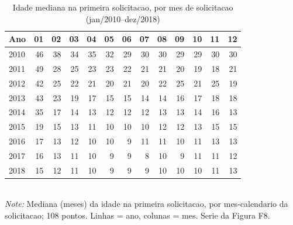 \begin{table}[htbp]\centering
\caption{Idade mediana na primeira solicitacao, por mes de solicitacao (jan/2010--dez/2018)}
\label{tab:S7c}
\small
\begin{tabular}{lrrrrrrrrrrrr}
\toprule
Ano & 01 & 02 & 03 & 04 & 05 & 06 & 07 & 08 & 09 & 10 & 11 & 12 \\
\midrule
2010 & 46 & 38 & 34 & 35 & 32 & 29 & 30 & 30 & 29 & 29 & 30 & 30 \\
2011 & 49 & 28 & 25 & 23 & 23 & 22 & 21 & 21 & 20 & 19 & 18 & 21 \\
2012 & 42 & 25 & 22 & 21 & 20 & 21 & 20 & 22 & 25 & 21 & 25 & 19 \\
2013 & 43 & 23 & 19 & 17 & 15 & 15 & 14 & 14 & 16 & 17 & 18 & 18 \\
2014 & 35 & 17 & 14 & 13 & 12 & 12 & 12 & 13 & 13 & 14 & 16 & 13 \\
2015 & 19 & 15 & 13 & 11 & 10 & 10 & 10 & 12 & 12 & 13 & 15 & 15 \\
2016 & 17 & 13 & 12 & 10 & 10 & 9 & 11 & 11 & 10 & 11 & 13 & 13 \\
2017 & 16 & 13 & 11 & 10 & 9 & 9 & 8 & 10 & 9 & 11 & 11 & 12 \\
2018 & 15 & 12 & 11 & 10 & 9 & 9 & 9 & 10 & 10 & 10 & 11 & 13 \\
\bottomrule
\end{tabular}
\\[3pt]{\footnotesize \textit{Note:} Mediana (meses) da idade na primeira solicitacao, por mes-calendario da solicitacao; 108 pontos. Linhas = ano, colunas = mes. Serie da Figura F8.}
\end{table}
